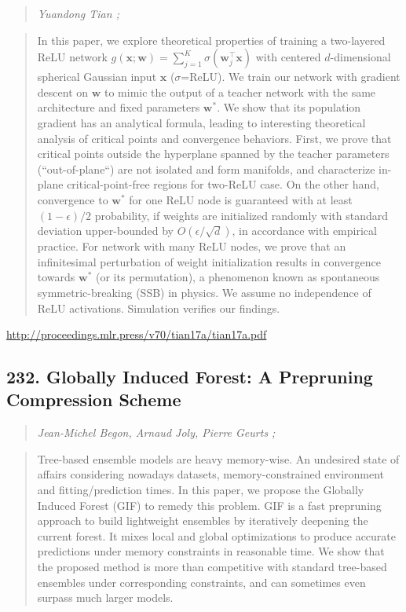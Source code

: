 \documentclass{article}
\begin{document}
\begin{quote}
\footnotesize{\textit{Yuandong Tian ;}}

\end{quote}

\begin{quote}
    In this paper, we explore theoretical properties of training a two-layered ReLU network $g(\mathbf{x}; \mathbf{w}) = \sum_{j=1}^K \sigma(\mathbf{w}_j^\top\mathbf{x})$ with centered $d$-dimensional spherical Gaussian input $\mathbf{x}$ ($\sigma$=ReLU). We train our network with gradient descent on $\mathbf{w}$ to mimic the output of a teacher network with the same architecture and fixed parameters $\mathbf{w}^*$. We show that its population gradient has an analytical formula, leading to interesting theoretical analysis of critical points and convergence behaviors. First, we prove that critical points outside the hyperplane spanned by the teacher parameters (“out-of-plane“) are not isolated and form manifolds, and characterize in-plane critical-point-free regions for two-ReLU case. On the other hand, convergence to $\mathbf{w}^*$ for one ReLU node is guaranteed with at least $(1-\epsilon)/2$ probability, if weights are initialized randomly with standard deviation upper-bounded by $O(\epsilon/\sqrt{d})$, in accordance with empirical practice. For network with many ReLU nodes, we prove that an infinitesimal perturbation of weight initialization results in convergence towards $\mathbf{w}^*$ (or its permutation), a phenomenon known as spontaneous symmetric-breaking (SSB) in physics. We assume no independence of ReLU activations. Simulation verifies our findings.  
\end{quote}

\href{http://proceedings.mlr.press/v70/tian17a/tian17a.pdf}{http://proceedings.mlr.press/v70/tian17a/tian17a.pdf}

\subsection{232. Globally Induced Forest: A Prepruning Compression Scheme}

\begin{quote}
\footnotesize{\textit{Jean-Michel Begon, Arnaud Joly, Pierre Geurts ;}}

\end{quote}

\begin{quote}
    Tree-based ensemble models are heavy memory-wise. An undesired state of affairs considering nowadays datasets, memory-constrained environment and fitting/prediction times. In this paper, we propose the Globally Induced Forest (GIF) to remedy this problem. GIF is a fast prepruning approach to build lightweight ensembles by iteratively deepening the current forest. It mixes local and global optimizations to produce accurate predictions under memory constraints in reasonable time. We show that the proposed method is more than competitive with standard tree-based ensembles under corresponding constraints, and can sometimes even surpass much larger models.  
\end{quote}
\end{document}
